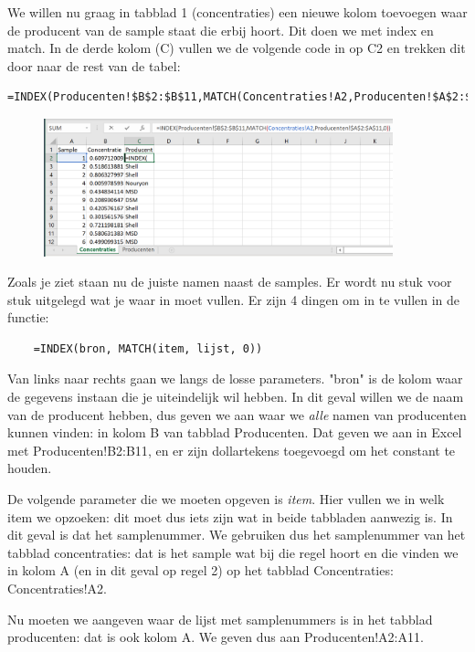 We willen nu graag in tabblad 1 (concentraties) een nieuwe kolom toevoegen waar de producent van de sample staat die erbij hoort. Dit doen we met index en match. In de derde kolom (C) vullen we de volgende code in op C2 en trekken dit door naar de rest van de tabel:
\begin{verbatim}
=INDEX(Producenten!$B$2:$B$11,MATCH(Concentraties!A2,Producenten!$A$2:$A$11,0))
\end{verbatim}
\begin{figure}[h]
\begin{center}
\includegraphics[width=0.9\textwidth]{img/index3.png}
\end{center}
\end{figure}

Zoals je ziet staan nu de juiste namen naast de samples. Er wordt nu stuk voor stuk uitgelegd wat je waar in moet vullen. Er zijn 4 dingen om in te vullen in de functie:

\begin{verbatim}
    =INDEX(bron, MATCH(item, lijst, 0))
\end{verbatim}
Van links naar rechts gaan we langs de losse parameters. "bron" is de kolom waar de gegevens instaan die je uiteindelijk wil hebben. In dit geval willen we de naam van de producent hebben, dus geven we aan waar we \textit{alle} namen van producenten kunnen vinden: in kolom B van tabblad Producenten. Dat geven we aan in Excel met \textsf{Producenten!B2:B11}, en er zijn dollartekens toegevoegd om het constant te houden. 

De volgende parameter die we moeten opgeven is \textit{item}. Hier vullen we in welk item we opzoeken: dit moet dus iets zijn wat in beide tabbladen aanwezig is. In dit geval is dat het samplenummer. We gebruiken dus het samplenummer van het tabblad concentraties: dat is het sample wat bij die regel hoort en die vinden we in kolom A (en in dit geval op regel 2) op het tabblad Concentraties: Concentraties!A2.

Nu moeten we aangeven waar de lijst met samplenummers is in het tabblad producenten: dat is ook kolom A. We geven dus aan Producenten!A2:A11. 

